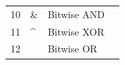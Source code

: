 \documentclass{article}
\begin{document}
\begin{table}[htb]
{\begin{tabular}{c l l l}
10 &                                                                                                              \& & Bitwise AND                                                                                                                          &                                                                                                                                                                                                                                                                                                                                                                                                                                                                                                                                                                                                                                \\
11 & \^{}                                                                                                          & Bitwise XOR                                                                                                                          &                                                                                                                                                                                                                                                                                                                                                                                                                                                                                                                                                                                                                                \\
12 & \textbar{}                                                                                                    & Bitwise OR                                                                                                                           &                                                                                                                                                                                                                                                                                                                                                                                                                                                                                                                                                                                                                                \\

\end{tabular}}
\end{table}
\end{document}
